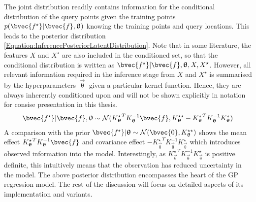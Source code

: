 \begin{equation}
				\end{equation} The joint distribution readily contains information for the conditional distribution of the query points given the training points $p(\bvec{f^{\star}} | \bvec{f}, \vec{\uptheta})$ knowing the training points and query locations. This leads to the posterior distribution \eqref{Equation:InferencePosteriorLatentDistribution}. Note that in some literature, the features $X$ and $X^{\star}$ are also included in the conditioned set, so that the conditional distribution is written as $\bvec{f^{\star}} | \bvec{f}, \vec{\uptheta}, X, X^{\star}$. However, all relevant information required in the inference stage from $X$ and $X^{\star}$ is summarised by the hyperparameters $\vec{\uptheta}$ given a particular kernel function. Hence, they are always inherently conditioned upon and will not be shown explicitly in notation for consise presentation in this thesis. \begin{equation}
					\bvec{f^{\star}} | \bvec{f}, \vec{\uptheta} \sim \mathcal{N}({K_{\vec{\uptheta}}^{\star}}^{T} K_{\vec{\uptheta}}^{-1} \bvec{f}, K_{\vec{\uptheta}}^{\star \star} - {K_{\vec{\uptheta}}^{\star}}^{T} K_{\vec{\uptheta}}^{-1} K_{\vec{\uptheta}}^{\star})
				\label{Equation:InferencePosteriorLatentDistribution}
				\end{equation} A comparison with the prior $\bvec{f^{\star}} | \vec{\uptheta} \sim \mathcal{N}(\bvec{0}, K_{\vec{\uptheta}}^{\star \star})$ shows the mean effect ${K_{\vec{\uptheta}}^{\star}}^{T} K_{\vec{\uptheta}}^{-1} \bvec{f}$ and covariance effect $- {K_{\vec{\uptheta}}^{\star}}^{T} K_{\vec{\uptheta}}^{-1} K_{\vec{\uptheta}}^{\star}$ which introduces observed information into the model. Interestingly, as ${K_{\vec{\uptheta}}^{\star}}^{T} K_{\vec{\uptheta}}^{-1} K_{\vec{\uptheta}}^{\star}$ is positive definite, this intuitively means that the observation has reduced uncertainty in the model. The above posterior distribution encompasses the heart of the GP regression model. The rest of the discussion will focus on detailed aspects of its implementation and variants.
				
